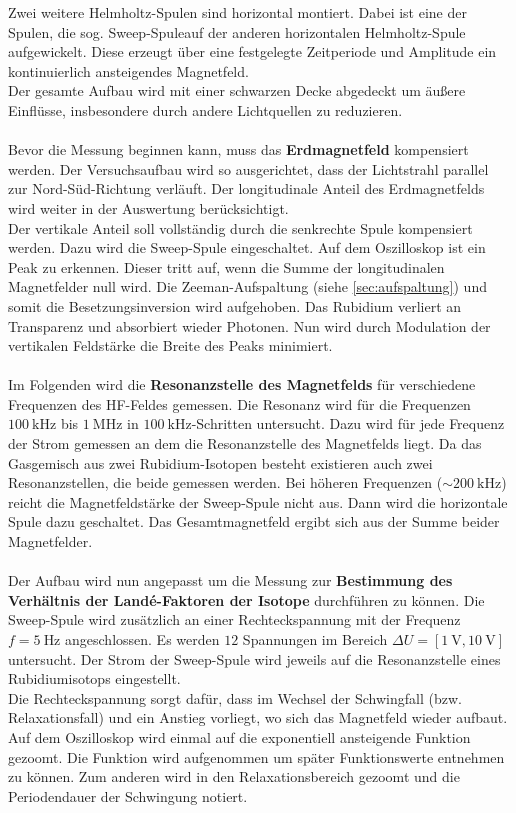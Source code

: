 Zwei weitere Helmholtz-Spulen sind horizontal montiert.
Dabei ist eine der Spulen, die sog. \glqq Sweep-Spule\grqq  auf der anderen horizontalen Helmholtz-Spule aufgewickelt.
Diese erzeugt über eine festgelegte Zeitperiode und Amplitude ein kontinuierlich ansteigendes Magnetfeld.
\\
Der gesamte Aufbau wird mit einer schwarzen Decke abgedeckt um äußere Einflüsse, insbesondere durch andere Lichtquellen zu reduzieren.
\\
\\
Bevor die Messung beginnen kann, muss das \textbf{Erdmagnetfeld} kompensiert werden.
Der Versuchsaufbau wird so ausgerichtet, dass der Lichtstrahl parallel zur Nord-Süd-Richtung verläuft.
Der longitudinale Anteil des Erdmagnetfelds wird weiter in der Auswertung berücksichtigt.
\\
Der vertikale Anteil soll vollständig durch die senkrechte Spule kompensiert werden.
Dazu wird die Sweep-Spule eingeschaltet.
Auf dem Oszilloskop ist ein Peak zu erkennen.
Dieser tritt auf, wenn die Summe der longitudinalen Magnetfelder null wird.
Die Zeeman-Aufspaltung (siehe \autoref{sec:aufspaltung}) und somit die Besetzungsinversion wird aufgehoben.
Das Rubidium verliert an Transparenz und absorbiert wieder Photonen.
Nun wird durch Modulation der vertikalen Feldstärke die Breite des Peaks minimiert.
\\
\\
Im Folgenden wird die \textbf{Resonanzstelle des Magnetfelds} für verschiedene Frequenzen des HF-Feldes gemessen.
Die Resonanz wird für die Frequenzen $\qty{100}{\kilo\hertz}$ bis $\qty{1}{\mega\hertz}$ in $\qty{100}{\kilo\hertz}$-Schritten untersucht.
Dazu wird für jede Frequenz der Strom gemessen an dem die Resonanzstelle des Magnetfelds liegt.
Da das Gasgemisch aus zwei Rubidium-Isotopen besteht existieren auch zwei Resonanzstellen, die beide gemessen werden.
Bei höheren Frequenzen ($\sim \qty{200}{\kilo\hertz}$) reicht die Magnetfeldstärke der Sweep-Spule nicht aus.
Dann wird die horizontale Spule dazu geschaltet.
Das Gesamtmagnetfeld ergibt sich aus der Summe beider Magnetfelder.
\\
\\
Der Aufbau wird nun angepasst um die Messung zur \textbf{Bestimmung des Verhältnis der Landé-Faktoren der Isotope} durchführen zu können.
Die Sweep-Spule wird zusätzlich an einer Rechteckspannung mit der Frequenz $f=\qty{5}{\hertz}$ angeschlossen.
Es werden $12$ Spannungen im Bereich $\Delta U = [\qty{1}{\volt}, \qty{10}{\volt}]$ untersucht.
Der Strom der Sweep-Spule wird jeweils auf die Resonanzstelle eines Rubidiumisotops eingestellt.
\\
Die Rechteckspannung sorgt dafür, dass im Wechsel der Schwingfall (bzw. Relaxationsfall) und ein Anstieg vorliegt, wo sich das Magnetfeld wieder aufbaut.
\\
Auf dem Oszilloskop wird einmal auf die exponentiell ansteigende Funktion gezoomt.
Die Funktion wird aufgenommen um später Funktionswerte entnehmen zu können.
Zum anderen wird in den Relaxationsbereich gezoomt und die Periodendauer der Schwingung notiert.